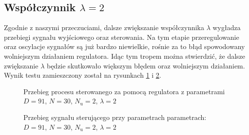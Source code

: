 \subsection{Współczynnik $\lambda = 2$}
Zgodnie z naszymi przeczuciami, dalsze zwiększanie współczynnika $\lambda$ wygładza przebiegi sygnału wyjściowego oraz sterowania. Na tym etapie przeregulowanie oraz oscylacje sygnałów są już bardzo niewielkie, rośnie za to błąd spowodowany wolniejszym działaniem regulatora. Idąc tym tropem można stwierdzić, że dalsze zwiększanie $\lambda$ będzie skutkowało większym błędem oraz wolniejszym działaniem. Wynik testu zamieszczony został na rysunkach \ref{dmc_lam_2_y} i \ref{dmc_lam_2_u}.

\begin{figure}[b]
    \centering
    \caption{Przebieg procesu sterowanego za pomocą regulatora z parametrami $D = 91$, $N = 30$, $N_{\mathrm{u}} = 2$, $\lambda = 2$}
    \label{dmc_lam_2_y}
\end{figure}

\begin{figure}[b]
    \centering
    \caption{Przebieg sygnału sterującego przy parametrach parametrach: $D = 91$, $N = 30$, $N_{\mathrm{u}} = 2$, $\lambda = 2$}
    \label{dmc_lam_2_u}
\end{figure}

